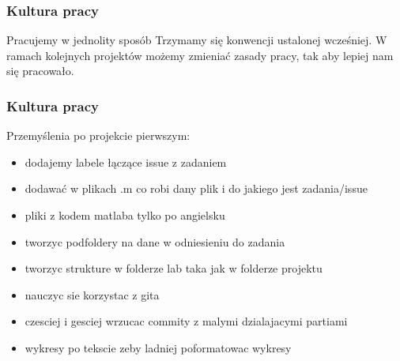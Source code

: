 \begin{frame}
    \frametitle{Kultura pracy}
    \begin{block}{Pracujemy w jednolity sposób}
        Trzymamy się konwencji ustalonej wcześniej. W ramach kolejnych projektów możemy zmieniać
        zasady pracy, tak aby lepiej nam się pracowało.
    \end{block}
\end{frame}

\begin{frame}
    \frametitle{Kultura pracy}
    Przemyślenia po projekcie pierwszym:
    \begin{itemize}
        \item dodajemy labele łączące issue z zadaniem
        \item dodawać w plikach .m co robi dany plik i do jakiego jest zadania/issue
        \item pliki z kodem matlaba tylko po angielsku
        \item tworzyc podfoldery na dane w odniesieniu do zadania
        \item tworzyc strukture w folderze lab taka jak w folderze projektu
        \item nauczyc sie korzystac z gita
        \item czesciej i gesciej wrzucac commity z malymi dzialajacymi partiami
        \item wykresy po tekscie zeby ladniej poformatowac wykresy
    \end{itemize}
\end{frame}